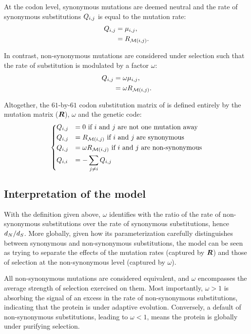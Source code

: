 At the codon level, synonymous mutations are deemed neutral and the rate of synonymous substitutions ${Q_{{i}, {j}}}$ is equal to the mutation rate:
\begin{align}
    Q_{{i}, {j}} & = \mu_{{i}, {j}}, \\
    & = R_{\mathcal{M}({i}, {j})}.
\end{align}

In contrast, non-synonymous mutations are considered under selection such that the rate of substitution is modulated by a factor $\omega$:
\begin{align}
    Q_{{i}, {j}} & = \omega \mu_{{i}, {j}}, \\
    & = \omega R_{\mathcal{M}({i}, {j})}.
\end{align}

Altogether, the $61$-by-$61$ codon substitution matrix of \citet{Muse1994} is defined entirely by the mutation matrix ($\bm{R}$), $\omega$ and the genetic code:
\begin{equation}
    \begin{dcases}
        Q_{{i}, {j}} & = 0 \text{ if ${i}$ and ${j}$ are not one mutation away} \\
        Q_{{i}, {j}} & = R_{\mathcal{M}({i}, {j})} \text{ if ${i}$ and ${j}$ are synonymous} \\
        Q_{{i}, {j}} & = \omega R_{\mathcal{M}({i}, {j})} \text{ if ${i}$ and ${j}$ are non-synonymous} \\
        Q_{{i}, {i}} & = - \sum\limits_{{j} \neq {i}} Q_{{i}, {j}}
    \end{dcases}
    \label{eq:codon-models}
\end{equation}

\subsection{Interpretation of the model}
\label{subsec:interpretation-of-the-model}

With the definition given above, $\omega$ identifies with the ratio of the rate of non-synonymous substitutions over the rate of synonymous substitutions, hence $d_N / d_S$.
More globally, given how its parameterization carefully distinguishes between synonymous and non-synonymous substitutions, the model can be seen as trying to separate the effects of the mutation rates (captured by $\bm{R}$) and those of selection at the non-synonymous level (captured by $\omega$).

All non-synonymous mutations are considered equivalent, and $\omega$ encompasses the average strength of selection exercised on them.
Most importantly, $\omega>1$ is absorbing the signal of an excess in the rate of non-synonymous substitutions, indicating that the protein is under adaptive evolution.
Conversely, a default of non-synonymous substitutions, leading to $\omega<1$, means the protein is globally under purifying selection.


